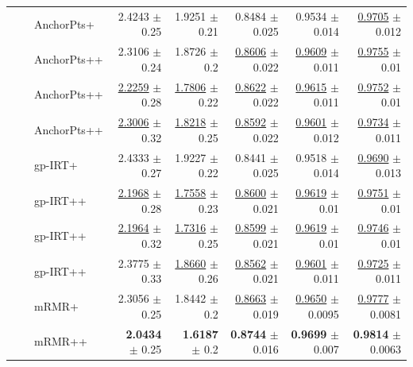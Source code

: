 \begin{longtable}{llp{}rrrrr}
 &  & AnchorPts+ & 2.4243 {\scriptsize $\pm$ 0.25} & 1.9251 {\scriptsize $\pm$ 0.21} & 0.8484 {\scriptsize $\pm$ 0.025} & 0.9534 {\scriptsize $\pm$ 0.014} & \underline{0.9705} {\scriptsize $\pm$ 0.012} \\
 &  & AnchorPts++ & 2.3106 {\scriptsize $\pm$ 0.24} & 1.8726 {\scriptsize $\pm$ 0.2} & \underline{0.8606} {\scriptsize $\pm$ 0.022} & \underline{0.9609} {\scriptsize $\pm$ 0.011} & \underline{0.9755} {\scriptsize $\pm$ 0.01} \\
 &  & AnchorPts++ & \underline{2.2259} {\scriptsize $\pm$ 0.28} & \underline{1.7806} {\scriptsize $\pm$ 0.22} & \underline{0.8622} {\scriptsize $\pm$ 0.022} & \underline{0.9615} {\scriptsize $\pm$ 0.011} & \underline{0.9752} {\scriptsize $\pm$ 0.01} \\
 &  & AnchorPts++ & \underline{2.3006} {\scriptsize $\pm$ 0.32} & \underline{1.8218} {\scriptsize $\pm$ 0.25} & \underline{0.8592} {\scriptsize $\pm$ 0.022} & \underline{0.9601} {\scriptsize $\pm$ 0.012} & \underline{0.9734} {\scriptsize $\pm$ 0.011} \\
 &  & gp-IRT+ & 2.4333 {\scriptsize $\pm$ 0.27} & 1.9227 {\scriptsize $\pm$ 0.22} & 0.8441 {\scriptsize $\pm$ 0.025} & 0.9518 {\scriptsize $\pm$ 0.014} & \underline{0.9690} {\scriptsize $\pm$ 0.013} \\
 &  & gp-IRT++ & \underline{2.1968} {\scriptsize $\pm$ 0.28} & \underline{1.7558} {\scriptsize $\pm$ 0.23} & \underline{0.8600} {\scriptsize $\pm$ 0.021} & \underline{0.9619} {\scriptsize $\pm$ 0.01} & \underline{0.9751} {\scriptsize $\pm$ 0.01} \\
 &  & gp-IRT++ & \underline{2.1964} {\scriptsize $\pm$ 0.32} & \underline{1.7316} {\scriptsize $\pm$ 0.25} & \underline{0.8599} {\scriptsize $\pm$ 0.021} & \underline{0.9619} {\scriptsize $\pm$ 0.01} & \underline{0.9746} {\scriptsize $\pm$ 0.01} \\
 &  & gp-IRT++ & 2.3775 {\scriptsize $\pm$ 0.33} & \underline{1.8660} {\scriptsize $\pm$ 0.26} & \underline{0.8562} {\scriptsize $\pm$ 0.021} & \underline{0.9601} {\scriptsize $\pm$ 0.011} & \underline{0.9725} {\scriptsize $\pm$ 0.011} \\
 &  & mRMR+ & 2.3056 {\scriptsize $\pm$ 0.25} & 1.8442 {\scriptsize $\pm$ 0.2} & \underline{0.8663} {\scriptsize $\pm$ 0.019} & \underline{0.9650} {\scriptsize $\pm$ 0.0095} & \underline{0.9777} {\scriptsize $\pm$ 0.0081} \\
 &  & mRMR++ & \textbf{2.0434} {\scriptsize $\pm$ 0.25} & \textbf{1.6187} {\scriptsize $\pm$ 0.2} & \textbf{0.8744} {\scriptsize $\pm$ 0.016} & \textbf{0.9699} {\scriptsize $\pm$ 0.007} & \textbf{0.9814} {\scriptsize $\pm$ 0.0063} \\

\end{longtable}
